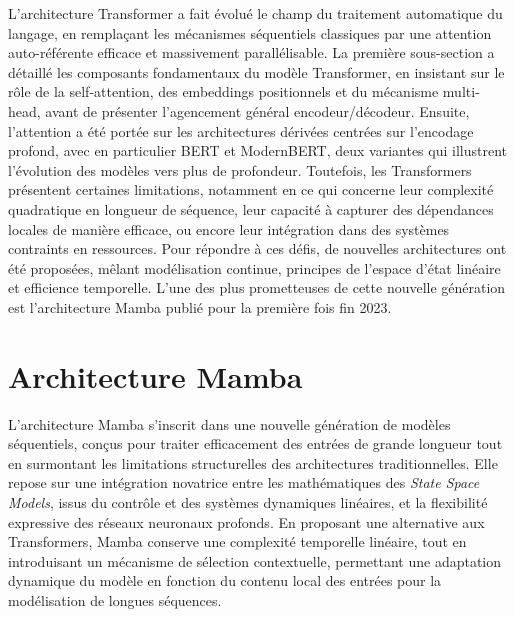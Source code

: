 L'architecture Transformer a fait évolué le champ du traitement automatique du langage, en remplaçant les mécanismes séquentiels classiques par une attention auto-référente efficace et massivement parallélisable. La première sous-section a détaillé les composants fondamentaux du modèle Transformer, en insistant sur le rôle  de la self-attention, des embeddings positionnels et du mécanisme multi-head, avant de présenter l’agencement général encodeur/décodeur. Ensuite, l’attention a été portée sur les architectures dérivées centrées sur l’encodage profond, avec en particulier BERT et ModernBERT, deux variantes qui illustrent l’évolution des modèles vers plus de profondeur. Toutefois, les Transformers présentent certaines limitations, notamment en ce qui concerne leur complexité quadratique en longueur de séquence, leur capacité à capturer des dépendances locales de manière efficace, ou encore leur intégration dans des systèmes contraints en ressources. Pour répondre à ces défis, de nouvelles architectures ont été proposées, mêlant modélisation continue, principes de l’espace d’état linéaire et efficience temporelle. L’une des plus prometteuses de cette nouvelle génération est l’architecture Mamba publié pour la première fois fin 2023.

\section{Architecture Mamba}

L’architecture Mamba s’inscrit dans une nouvelle génération de modèles séquentiels, conçus pour traiter efficacement des entrées de grande longueur tout en surmontant les limitations structurelles des architectures traditionnelles. Elle repose sur une intégration novatrice entre les mathématiques des \textit{State Space Models}, issus du contrôle et des systèmes dynamiques linéaires, et la flexibilité expressive des réseaux neuronaux profonds. En proposant une alternative aux Transformers, Mamba conserve une complexité temporelle linéaire,  tout en introduisant un mécanisme de sélection contextuelle, permettant une adaptation dynamique du modèle en fonction du contenu local des entrées pour la modélisation de longues séquences.\\

